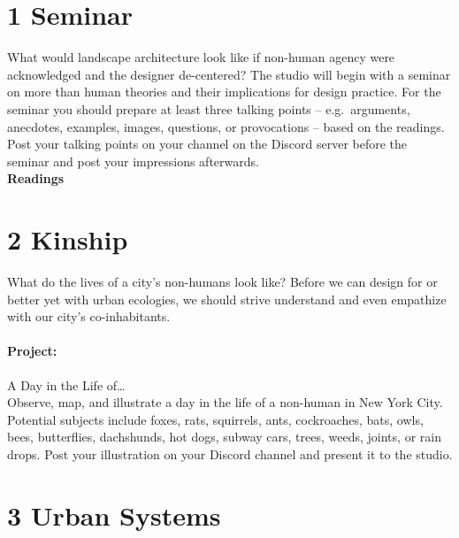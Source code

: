 \documentclass[11pt,article,oneside]{memoir}
\begin{document}

\section{1 Seminar}
What would landscape architecture look like if non-human agency were acknowledged and the designer de-centered? The studio will begin with a seminar on more than human theories and their implications for design practice. For the seminar you should prepare at least three talking points -- e.g.~arguments, anecdotes, examples, images, questions, or provocations -- based on the readings. Post your talking points on your channel on the Discord server before the seminar and post your impressions afterwards. 
\\

\noindent
\textbf{Readings}
\nocite{*}
\setlength{}
\printbibliography[keyword=seminar, heading=none] 


\section{2 Kinship}

What do the lives of a city's non-humans look like? Before we can design for or better yet with urban ecologies, we should strive understand and even empathize with our city's co-inhabitants. 

\paragraph{Project:} A Day in the Life of\ldots \\

\noindent
Observe, map, and illustrate a day in the life of a non-human in New York City. Potential subjects include foxes, rats, squirrels, ants, cockroaches, bats, owls, bees, butterflies, dachshunds, hot dogs, subway cars, trees, weeds, joints, or rain drops. Post your illustration on your Discord channel and present it to the studio. 
%


\section{3 Urban Systems}
\end{document}
